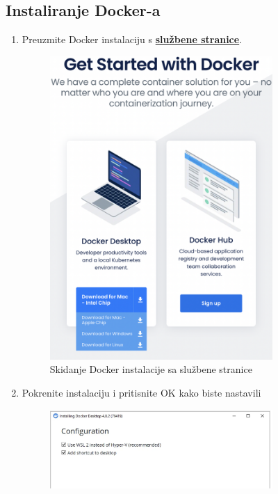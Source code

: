 		\subsection*{Instaliranje Docker-a}
		\begin{enumerate}
			\item Preuzmite Docker instalaciju s \textbf{\href{https://docs.docker.com/get-docker/}{službene stranice}}.
			\begin{figure}[h]
				\centering
				\includegraphics[width=0.8\textwidth]{slike/docker_install/0.png}
				\caption{Skidanje Docker instalacije sa službene stranice}
			\end{figure}
			\item Pokrenite instalaciju i pritisnite OK kako biste nastavili
			\begin{figure}[h]
				\centering
				\includegraphics[width=0.8\textwidth]{slike/docker_install/2.png}

\end{figure}
\end{enumerate}
